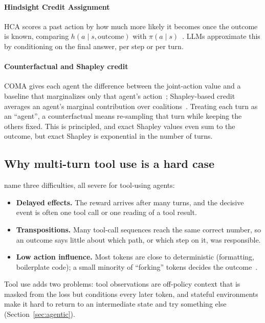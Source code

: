 \paragraph{Hindsight Credit Assignment}
HCA scores a past action by how much more likely it becomes once the outcome is known, comparing $h(a\mid s,\text{outcome})$ with $\pi(a\mid s)$~\citep{harutyunyan2019hindsight}. LLMs approximate this by conditioning on the final answer, per step or per turn.

\paragraph{Counterfactual and Shapley credit}
COMA gives each agent the difference between the joint-action value and a baseline that marginalizes only that agent's action~\citep{foerster2018counterfactual}; Shapley-based credit averages an agent's marginal contribution over coalitions~\citep{wang2020shapley}. Treating each turn as an ``agent'', a counterfactual means re-sampling that turn while keeping the others fixed. This is principled, and exact Shapley values even sum to the outcome, but exact Shapley is exponential in the number of turns.

\subsection{Why multi-turn tool use is a hard case}

\citet{pignatelli2024survey} name three difficulties, all severe for tool-using agents:
\begin{itemize}
  \item \textbf{Delayed effects.} The reward arrives after many turns, and the decisive event is often one tool call or one reading of a tool result.
  \item \textbf{Transpositions.} Many tool-call sequences reach the same correct number, so an outcome says little about which path, or which step on it, was responsible.
  \item \textbf{Low action influence.} Most tokens are close to deterministic (formatting, boilerplate code); a small minority of ``forking'' tokens decides the outcome~\citep{wang2025beyond}.
\end{itemize}
Tool use adds two problems: tool observations are off-policy context that is masked from the loss but conditions every later token, and stateful environments make it hard to return to an intermediate state and try something else (Section~\ref{sec:agentic}).

